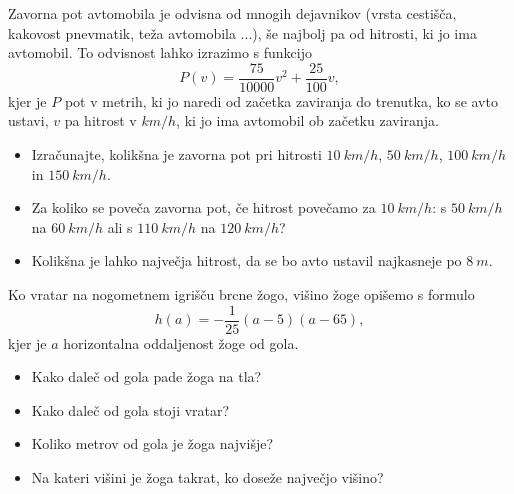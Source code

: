         \begin{naloga}
            Zavorna pot avtomobila je odvisna od mnogih dejavnikov (vrsta cestišča, kakovost pnevmatik, teža avtomobila ...),
            še najbolj pa od hitrosti, ki jo ima avtomobil.
            To odvisnost lahko izrazimo s funkcijo $$ P(v)= \dfrac{75}{10000}v^2+\frac{25}{100}v, $$ 
            kjer je $P$ pot v metrih, ki jo naredi od začetka zaviranja do trenutka, ko se avto ustavi,
            $v$ pa hitrost v $km/h$, ki jo ima avtomobil ob začetku zaviranja.

            \begin{itemize}
                \item Izračunajte, kolikšna je zavorna pot pri hitrosti $10~km/h$, $50~km/h$, $100~km/h$ in $150~km/h$.
                \item Za koliko se poveča zavorna pot, če hitrost povečamo za $10~km/h$: s $50~km/h$ na $60~km/h$ ali s $110~km/h$ na $120~km/h$?
                \item Kolikšna je lahko največja hitrost, da se bo avto ustavil najkasneje po $8~m$.
            \end{itemize}
                            
        \end{naloga}





        \begin{naloga}
            Ko vratar na nogometnem igrišču brcne žogo, višino žoge opišemo s formulo
            $$ h(a)=-\frac{1}{25}\left(a-5\right)\left(a-65\right), $$
            kjer je $a$ horizontalna oddaljenost žoge od gola.
            
            \begin{itemize}
                \item Kako daleč od gola pade žoga na tla?
                \item Kako daleč od gola stoji vratar?
                \item Koliko metrov od gola je žoga najvišje?
                \item Na kateri višini je žoga takrat, ko doseže največjo višino?
            \end{itemize}
                            
        \end{naloga}



